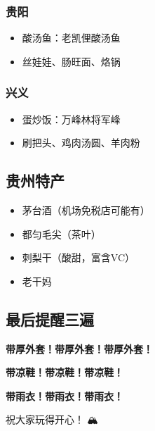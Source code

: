 \documentclass[12pt,a4paper,UTF8]{ctexart}
\begin{document}
\subsubsection{贵阳}
\begin{itemize}
\item 酸汤鱼：老凯俚酸汤鱼
\item 丝娃娃、肠旺面、烙锅
\end{itemize}

\subsubsection{兴义}
\begin{itemize}
\item 蛋炒饭：万峰林将军峰
\item 刷把头、鸡肉汤圆、羊肉粉
\end{itemize}

\subsection{贵州特产}
\begin{itemize}
\item 茅台酒（机场免税店可能有）
\item 都匀毛尖（茶叶）
\item 刺梨干（酸甜，富含VC）
\item 老干妈
\end{itemize}

\subsection{最后提醒三遍}
\begin{center}
\Large \textbf{带厚外套！带厚外套！带厚外套！}
\end{center}
\begin{center}
\Large \textbf{带凉鞋！带凉鞋！带凉鞋！}
\end{center}
\begin{center}
\Large \textbf{带雨衣！带雨衣！带雨衣！}
\end{center}

\vspace{2cm}
\begin{center}
\Huge 祝大家玩得开心！🚗🏔️🌊
\end{center}
\end{document}
